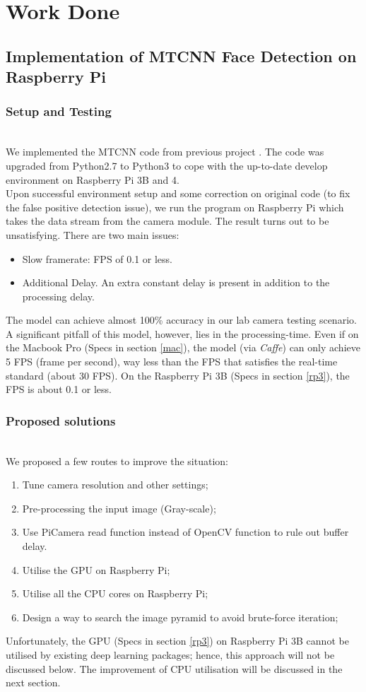 \chapter{Work Done}

 
\section{Implementation of MTCNN Face Detection on Raspberry Pi}
\label{mtcnn_face}
\subsection{Setup and Testing}\\[.2in]
We implemented the MTCNN code from previous project \cite{GitMTCNN}. The code was upgraded from Python2.7 to Python3 to cope with the up-to-date develop environment on Raspberry Pi 3B and 4.\\[.2in]
Upon successful environment setup and some correction on original code (to fix the false positive detection issue), we run the program on Raspberry Pi which takes the data stream from the camera module. The result turns out to be unsatisfying. There are two main issues:
\begin{itemize}
    \item Slow framerate: FPS of 0.1 or less.
    \item Additional Delay. An extra constant delay is present in addition to the processing delay.
\end{itemize}
The model can achieve almost 100\% accuracy in our lab camera testing scenario. A significant pitfall of this model, however, lies in the processing-time. Even if on the Macbook Pro (Specs in section  \ref{mac}), the model (via {\it Caffe}) can only achieve 5 FPS (frame per second), way less than the FPS that satisfies the real-time standard (about 30 FPS). On the Raspberry Pi 3B (Specs in section \ref{rp3}), the FPS is about 0.1 or less.

\subsection{Proposed solutions}\\[.2in]

We proposed a few routes to improve the situation:
\begin{enumerate}
    \item Tune camera resolution and other settings;
    \item Pre-processing the input image (Gray-scale);
    \item Use PiCamera read function instead of OpenCV function to rule out buffer delay.
    \item Utilise the GPU on Raspberry Pi;
    \item Utilise all the CPU cores on Raspberry Pi;
    \item Design a way to search the image pyramid to avoid brute-force iteration;
\end{enumerate}
Unfortunately, the GPU (Specs in section \ref{rp3}) on Raspberry Pi 3B cannot be utilised by existing deep learning packages; hence, this approach will not be discussed below. The improvement of CPU utilisation will be discussed in the next section.

